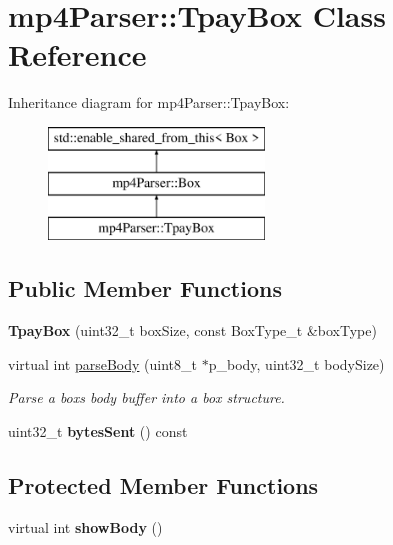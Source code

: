 \hypertarget{classmp4_parser_1_1_tpay_box}{}\section{mp4\+Parser\+::Tpay\+Box Class Reference}
\label{classmp4_parser_1_1_tpay_box}
Inheritance diagram for mp4\+Parser\+::Tpay\+Box\+:\begin{figure}[H]
\begin{center}
\leavevmode
\includegraphics[height=3.000000cm]{classmp4_parser_1_1_tpay_box}
\end{center}
\end{figure}
\subsection*{Public Member Functions}
\begin{DoxyCompactItemize}
\item 
\mbox{\label{classmp4_parser_1_1_tpay_box_aa768232fa9a2085adc2df1e5fc00020b}} 
{\bfseries Tpay\+Box} (uint32\+\_\+t box\+Size, const Box\+Type\+\_\+t \&box\+Type)
\item 
virtual int \mbox{\hyperlink{classmp4_parser_1_1_tpay_box_a3a1d0623a4d4a5fec2fa1843c4e2d329}{parse\+Body}} (uint8\+\_\+t $\ast$p\+\_\+body, uint32\+\_\+t body\+Size)
\begin{DoxyCompactList}\small\item\em Parse a box\textquotesingle{}s body buffer into a box structure. \end{DoxyCompactList}\item 
\mbox{\label{classmp4_parser_1_1_tpay_box_a5c900de374f91aa91397789da432e6a2}} 
uint32\+\_\+t {\bfseries bytes\+Sent} () const
\end{DoxyCompactItemize}
\subsection*{Protected Member Functions}
\begin{DoxyCompactItemize}
\item 
\mbox{\label{classmp4_parser_1_1_tpay_box_ac2879e7789e33da2e1a4b2141078656d}} 
virtual int {\bfseries show\+Body} ()
\end{DoxyCompactItemize}

